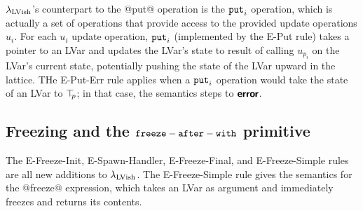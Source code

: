 $\lambda_{\textrm{LVish}}$'s counterpart to the @put@ operation is the $\mbox{\texttt{put}}_i$
operation, which is actually a set of operations that provide access
to the provided update operations $u_i$.  For each $u_i$ update
operation, $\mbox{\texttt{put}}_i$ (implemented by the {\sc E-Put} rule) takes a
pointer to an LVar and updates the LVar's state to result of calling
$u_{p_i}$ on the LVar's current state, potentially pushing the state
of the LVar upward in the lattice.  THe {\sc E-Put-Err} rule applies
when a $\mbox{\texttt{put}}_i$ operation would take the state of an LVar to $\top\hspace{-0.85mm}_{p}$;
in that case, the semantics steps to $\textbf{\textsf{error}}$.

\subsection{Freezing and the ${\mbox{\texttt{freeze}}-\mbox{\texttt{after}}-\mbox{\texttt{with}}}$ primitive}\label{subsection:quasi-freezing}

The {\sc E-Freeze-Init}, {\sc E-Spawn-Handler}, {\sc E-Freeze-Final},
and {\sc E-Freeze-Simple} rules are all new additions to
$\lambda_{\textrm{LVish}}$.  The {\sc E-Freeze-Simple} rule gives the semantics
for the @freeze@ expression, which takes an LVar as argument and
immediately freezes and returns its contents.

